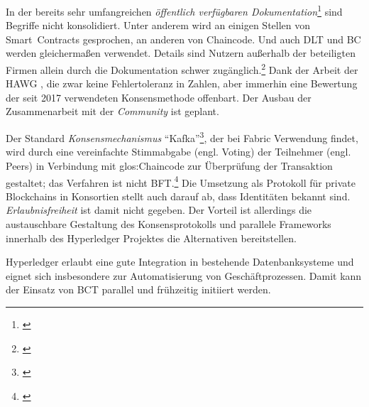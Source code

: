 In der bereits sehr umfangreichen \emph{öffentlich verfügbaren Dokumentation}\footnote{\cite{w:hyperledger:doc}} sind Begriffe nicht konsolidiert.
Unter anderem wird an einigen Stellen von Smart~Contracts gesprochen, an anderen von Chaincode.
Und auch \gls{DLT} und \gls{BC} werden gleichermaßen verwendet.
Details sind Nutzern außerhalb der beteiligten Firmen allein durch die Dokumentation schwer zugänglich.\footnote{\cite{p:hyperledger:arch}}
Dank der Arbeit der \gls{HAWG} \cite{p:hyperledger:consensus}, die zwar keine Fehlertoleranz in Zahlen, aber immerhin eine Bewertung der seit 2017 verwendeten Konsensmethode offenbart.
Der Ausbau der Zusammenarbeit mit der \emph{Community} ist geplant.

Der Standard \emph{Konsensmechanismus} \enquote{Kafka}\footnote{\cite{w:kafka}}, der bei  Fabric Verwendung findet, wird durch eine vereinfachte Stimmabgabe (engl. Voting) der Teilnehmer (engl. Peers) in Verbindung mit \gls{glos:Chaincode} zur Überprüfung der Transaktion gestaltet; das Verfahren ist nicht \gls{BFT}.\footnote{\cite{w:hyperledger:txworkflow}}
Die Umsetzung als Protokoll für private Blockchains in Konsortien stellt auch darauf ab, dass Identitäten bekannt sind.
\emph{Erlaubnisfreiheit} ist damit nicht gegeben.
Der Vorteil ist allerdings die austauschbare Gestaltung des Konsensprotokolls und parallele Frameworks innerhalb des Hyperledger Projektes die Alternativen bereitstellen.

Hyperledger erlaubt eine gute Integration in bestehende Datenbanksysteme und eignet sich insbesondere zur Automatisierung von Geschäftprozessen.
Damit kann der Einsatz von \gls{BCT} parallel und frühzeitig initiiert werden.

